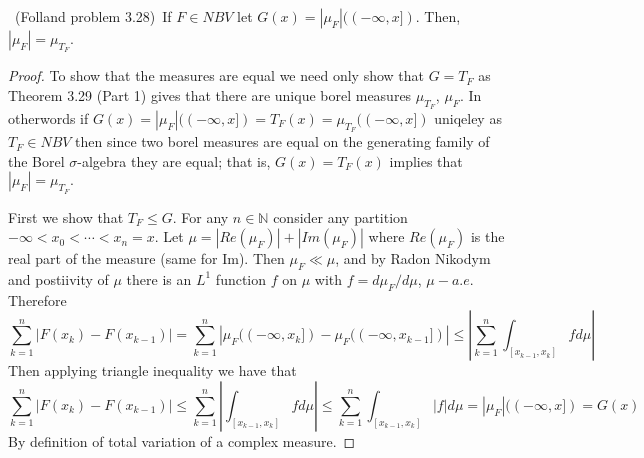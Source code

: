 \documentclass[11pt]{amsart}
\theoremstyle{definition}
\numberwithin{theorem}{section}
\numberwithin{definition}{section}
\numberwithin{equation}{section}
\begin{document}
\medskip {}\ (Folland problem 3.28)\ If $F \in NBV$ let $G(x) = |\mu_F|((-\infty ,x]).$ Then, $|\mu_F| = \mu_{T_F}$.
\begin{proof}
To show that the measures are equal we need only show that $G = T_F$ as Theorem 3.29 (Part 1) gives that there are
 unique borel measures $\mu_{T_F}$, $\mu_F$. In otherwords if $G(x) = |\mu_F|((-\infty ,x]) = T_F(x) = \mu_{T_F}((-\infty, x])$ uniqeley as $T_F \in NBV$ then since two
borel measures are equal on the generating family of the Borel $\sigma$-algebra they are equal; that is, $G(x) = T_F(x)$ implies 
that $|\mu_F| = \mu_{T_F}.$

First we show that $T_F \leq G$. For any $n \in \mathbb{N}$ consider any partition $-\infty < x_0 < \cdots < x_n =x$. Let $\mu = |Re(\mu_F)| + |Im(\mu_F)|$ where $Re(\mu_F)$ is the real part of the measure (same for Im). Then $\mu_F \ll \mu$, and by Radon Nikodym and postiivity of $\mu$ there is an $L^1$ function  $f$ on $\mu$ with $f = d\mu_F/d\mu$, $\mu-a.e$. Therefore 
\begin{equation*}
	\sum_{k=1}^n |F(x_{k}) - F(x_{k-1})| = \sum_{k=1}^n |\mu_F((-\infty,x_{k}]) - \mu_F((-\infty, x_{k-1}])| \leq \left|\sum_{k=1}^n \int_{[x_{k-1}, x_k]} f d\mu  \right|
\end{equation*}
Then applying triangle inequality we have that 
\begin{equation*}
	\sum_{k=1}^n |F(x_{k}) - F(x_{k-1})| \leq \sum_{k=1}^n  \left|\int_{[x_{k-1}, x_k]} f d\mu  \right| \leq \sum_{k=1}^n \int_{[x_{k-1}, x_k]} |f| d\mu  = |\mu_F|((-\infty, x]) = G(x)
\end{equation*}
By definition of total variation of a complex measure.


\end{proof}
\end{document}
